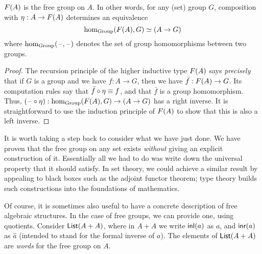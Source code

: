 \begin{thm}
  $F(A)$ is the free group on $A$.
  In other words, for any (set) group $G$, composition with $\eta:A\to F(A)$ determines an equivalence
  \[ \hom_{\mathrm{Group}}(F(A),G) \simeq (A\to G) \]
  where $\hom_{\mathrm{Group}}(\mathord{\hspace{1pt}\text{--}\hspace{1pt}},\mathord{\hspace{1pt}\text{--}\hspace{1pt}})$ denotes the set of group homomorphisms between two groups.
\end{thm}
\begin{proof}
  The recursion principle of the higher inductive type $F(A)$ says \emph{precisely} that if $G$ is a group and we have $f:A\to G$, then we have $\bar{f}:F(A) \to G$.
  Its computation rules say that $\bar{f}\circ \eta \equiv f$, and that $\bar f$ is a group homomorphism.
  Thus, $(\mathord{\hspace{1pt}\text{--}\hspace{1pt}}\circ \eta) :  \hom_{\mathrm{Group}}(F(A),G) \to (A\to G)$ has a right inverse.
  It is straightforward to use the induction principle of $F(A)$ to show that this is also a left inverse.
\end{proof}

It is worth taking a step back to consider what we have just done.
We have proven that the free group on any set exists \emph{without} giving an explicit construction of it.
Essentially all we had to do was write down the universal property that it should satisfy.
In set theory, we could achieve a similar result by appealing to black boxes such as the adjoint functor theorem; type theory builds such constructions into the foundations of mathematics.

Of course, it is sometimes also useful to have a concrete description of free algebraic structures.
In the case of free groups, we can provide one, using quotients.
Consider $\mathsf{List}(A+A)$, where in $A+A$ we write ${\mathsf{inl}}(a)$ as $a$, and ${\mathsf{inr}}(a)$ as $\hat{a}$ (intended to stand for the formal inverse of $a$).
The elements of $\mathsf{List}(A+A)$ are \emph{words} for the free group on $A$.

